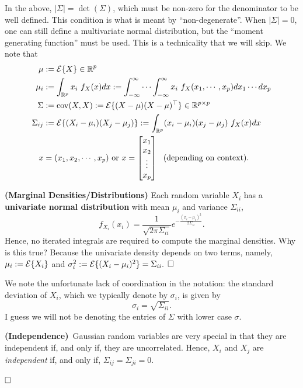 In the above, $|\Sigma| = \det(\Sigma)$, which must be non-zero for the denominator to be well defined. This condition is what is meant by ``non-degenerate''. When $|\Sigma|=0$, one can still define a multivariate normal distribution, but the ``moment generating function'' must be used. This is a technicality that we will skip. We note that
\begin{align*}
\mu &:= \mathcal{E}\{ X\}  \in \mathbb R^p \\
\mu_i &:= \int_{\mathbb R^p} x_i ~f_X(x) dx := \int_{-\infty}^{\infty} \cdots \int_{-\infty}^{\infty}x_i ~ f_X(x_1,\cdots, x_p) dx_1 \cdots dx_p \\
\Sigma &:=\mathrm{cov}(X,X) :=\mathcal{E}\{ (X-\mu) (X-\mu)^\top \}  \in \mathbb R^{p \times p} \\
\Sigma_{ij} &:=\mathcal{E}\{ (X_i-\mu_i) (X_j-\mu_j)\} := \int_{\mathbb R^p} (x_i-\mu_i)(x_j - \mu_j) ~f_X(x) dx \\
x & = (x_1, x_2, \cdots, x_p) \text{ or } x= \begin{bmatrix} x_1 \\ x_2 \\ \vdots\\ x_p \end{bmatrix}~~\mbox{(depending on context)}.
\end{align*}


\begin{fact} \textbf{(Marginal Densities/Distributions)} Each random variable $X_i$ has a \textbf{univariate normal distribution} with mean $\mu_i$ and variance $\Sigma_{ii}$,
$$ f_{X_i}(x_i) = \frac{1}{ \sqrt{2 \pi \Sigma_{ii} }} e^{-\frac{(x_i-\mu_i)^2}{2 \Sigma_{ii}}}.$$
Hence, no iterated integrals are required to compute the marginal densities. Why is this true? Because the univariate density depends on two terms, namely, $\mu_i:=\mathcal{E}\{X_i\}$ and $\sigma_i^2:=\mathcal{E}\{(X_i-\mu_i)^2\}=\Sigma_{ii}.$
$\hfill \square$     \end{fact}


 We note the unfortunate lack of coordination in the notation: the standard deviation of $X_i$, which we typically denote by $\sigma_i$,  is given by
$$\sigma_i = \sqrt{\Sigma_{ii}}. $$
I guess we will not be denoting the entries of $\Sigma$ with lower case $\sigma$.


\begin{fact}\textbf{(Independence)}~Gaussian random variables are very special in that they are independent if, and only if, they are uncorrelated. Hence, $X_i$ and $X_j$ are \textit{independent} if, and only if, $\Sigma_{ij} = \Sigma_{ji}=0$.

$\hfill \square$  \end{fact}


